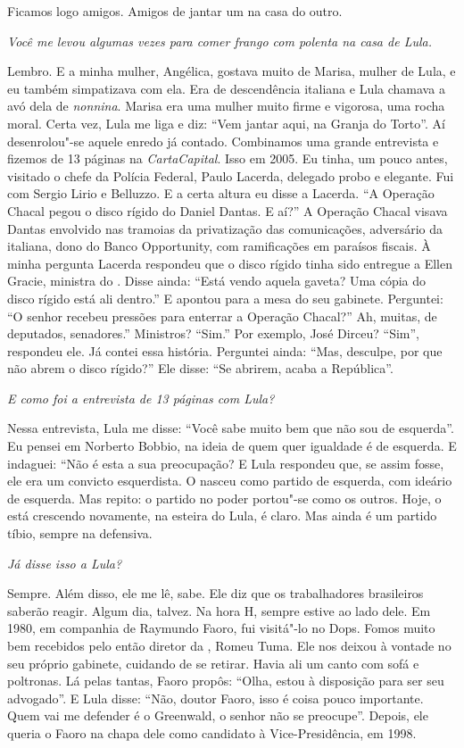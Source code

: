 \normalfont 
Ficamos logo amigos. Amigos de jantar um na casa do
outro.

\itshape
 Você me levou algumas vezes para comer frango com
polenta na casa de Lula.

\normalfont 
Lembro. E a minha mulher, Angélica, gostava muito de
Marisa, mulher de Lula, e eu também simpatizava com ela. Era de
descendência italiana e Lula chamava a avó dela de \emph{nonnina}.
Marisa era uma mulher muito firme e vigorosa, uma rocha moral. Certa
vez, Lula me liga e diz: ``Vem jantar aqui, na Granja do Torto''. Aí
desenrolou"-se aquele enredo já contado. Combinamos uma grande entrevista
e fizemos de 13 páginas na \emph{CartaCapital}. Isso em 2005. Eu tinha,
um pouco antes, visitado o chefe da Polícia Federal, Paulo Lacerda,
delegado probo e elegante. Fui com Sergio Lirio e Belluzzo. E a certa
altura eu disse a Lacerda. ``A Operação Chacal pegou o disco rígido do
Daniel Dantas. E aí?'' A Operação Chacal visava Dantas envolvido nas
tramoias da privatização das comunicações, adversário da  italiana,
dono do Banco Opportunity, com ramificações em paraísos fiscais. À minha
pergunta Lacerda respondeu que o disco rígido tinha sido entregue a
Ellen Gracie, ministra do . Disse ainda: ``Está vendo aquela gaveta?
Uma cópia do disco rígido está ali dentro.'' E apontou para a mesa do
seu gabinete. Perguntei: ``O senhor recebeu pressões para enterrar a
Operação Chacal?'' Ah, muitas, de deputados, senadores.'' Ministros?
``Sim.'' Por exemplo, José Dirceu? ``Sim'', respondeu ele. Já contei
essa história. Perguntei ainda: ``Mas, desculpe, por que não abrem o
disco rígido?'' Ele disse: ``Se abrirem, acaba a República''.

\itshape
 E como foi a entrevista de 13 páginas com Lula?

\normalfont 
Nessa entrevista, Lula me disse: ``Você sabe muito bem
que não sou de esquerda''. Eu pensei em Norberto Bobbio, na ideia de
quem quer igualdade é de esquerda. E indaguei: ``Não é esta a sua
preocupação? E Lula respondeu que, se assim fosse, ele era um convicto
esquerdista. O  nasceu como partido de esquerda, com ideário de
esquerda. Mas repito: o partido no poder portou"-se como os outros. Hoje,
o  está crescendo novamente, na esteira do Lula, é claro. Mas ainda é
um partido tíbio, sempre na defensiva.

\itshape
 Já disse isso a Lula?

\normalfont 
Sempre. Além disso, ele me lê, sabe. Ele diz que os
trabalhadores brasileiros saberão reagir. Algum dia, talvez. Na hora H,
sempre estive ao lado dele. Em 1980, em companhia de Raymundo Faoro, fui
visitá"-lo no Dops. Fomos muito bem recebidos pelo então diretor da ,
Romeu Tuma. Ele nos deixou à vontade no seu próprio gabinete, cuidando
de se retirar. Havia ali um canto com sofá e poltronas. Lá pelas tantas,
Faoro propôs: ``Olha, estou à disposição para ser seu advogado''. E Lula
disse: ``Não, doutor Faoro, isso é coisa pouco importante. Quem vai me
defender é o Greenwald, o senhor não se preocupe''. Depois, ele queria o
Faoro na chapa dele como candidato à Vice-Presidência, em 1998.

